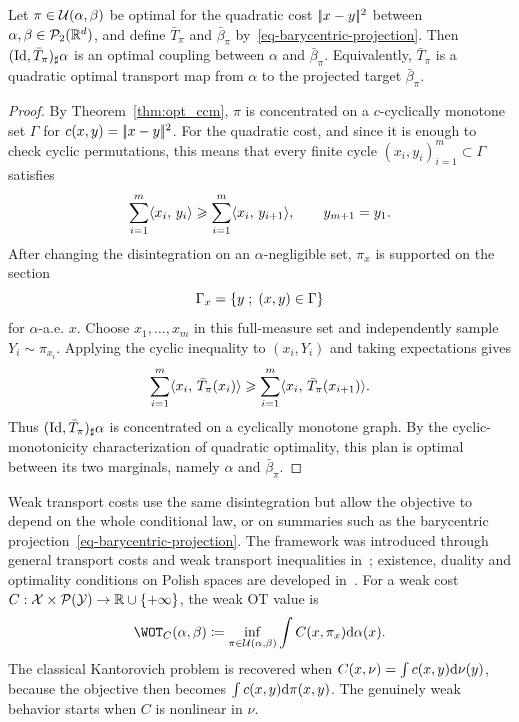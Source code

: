 \begin{prop}\label{prop-barycentric-projection-optimal}
	Let $\pi\in\mathcal{U}(\alpha,\beta)$ be optimal for the quadratic cost $|\!| x-y |\!|^2$ between $\alpha,\beta\in\mathcal{P}_2(\mathbb{R}^d)$, and define $\bar T_\pi$ and $\bar\beta_\pi$ by~\eqref{eq-barycentric-projection}. Then $(\mathrm{Id},\bar T_\pi)_\sharp\alpha$ is an optimal coupling between $\alpha$ and $\bar\beta_\pi$. Equivalently, $\bar T_\pi$ is a quadratic optimal transport map from $\alpha$ to the projected target $\bar\beta_\pi$.
\end{prop}

\begin{proof}
	By Theorem~\ref{thm:opt_ccm}, $\pi$ is concentrated on a $c$-cyclically monotone set $\Gamma$ for $c(x,y)=|\!| x-y |\!|^2$. For the quadratic cost, and since it is enough to check cyclic permutations, this means that every finite cycle $(x_i,y_i)_{i=1}^m\subset\Gamma$ satisfies
	\[
		\sum_{i=1}^m \langle x_i,\,y_i\rangle
		\geqslant
		\sum_{i=1}^m \langle x_i,\,y_{i+1}\rangle,
		\qquad y_{m+1}=y_1.
	\]
	After changing the disintegration on an $\alpha$-negligible set, $\pi_x$ is supported on the section
	\[
		\Gamma_x=\left\{ y \;;\; (x,y)\in\Gamma \right\}
	\]
	for $\alpha$-a.e. $x$.
	Choose $x_1,\ldots,x_m$ in this full-measure set and independently sample $Y_i\sim\pi_{x_i}$. Applying the cyclic inequality to $(x_i,Y_i)$ and taking expectations gives
	\[
		\sum_{i=1}^m \langle x_i,\,\bar T_\pi(x_i)\rangle
		\geqslant
		\sum_{i=1}^m \langle x_i,\,\bar T_\pi(x_{i+1})\rangle.
	\]
	Thus $(\mathrm{Id},\bar T_\pi)_\sharp\alpha$ is concentrated on a cyclically monotone graph. By the cyclic-monotonicity characterization of quadratic optimality, this plan is optimal between its two marginals, namely $\alpha$ and $\bar\beta_\pi$.
\end{proof}

Weak transport costs use the same disintegration but allow the objective to depend on the whole conditional law, or on summaries such as the barycentric projection~\eqref{eq-barycentric-projection}. The framework was introduced through general transport costs and weak transport inequalities in~\cite{gozlan2017kantorovich}; existence, duality and optimality conditions on Polish spaces are developed in~\cite{backhoff2019weak}. For a weak cost $C:\mathcal{X}\times\mathcal{P}(\mathcal{Y})\to\mathbb{R}\cup\{+\infty\}$, the weak OT value is
\begin{equation}\label{eq-weak-ot}
	\WOT_C(\alpha,\beta)
	\eqdef
	\inf_{\pi\in\Couplings(\alpha,\beta)}
	\int C(x,\pi_x)\d\alpha(x).
\end{equation}
The classical Kantorovich problem is recovered when $C(x,\nu)=\int c(x,y)\mathrm{d}\nu(y)$, because the objective then becomes $\int c(x,y)\mathrm{d}\pi(x,y)$. The genuinely weak behavior starts when $C$ is nonlinear in $\nu$.

